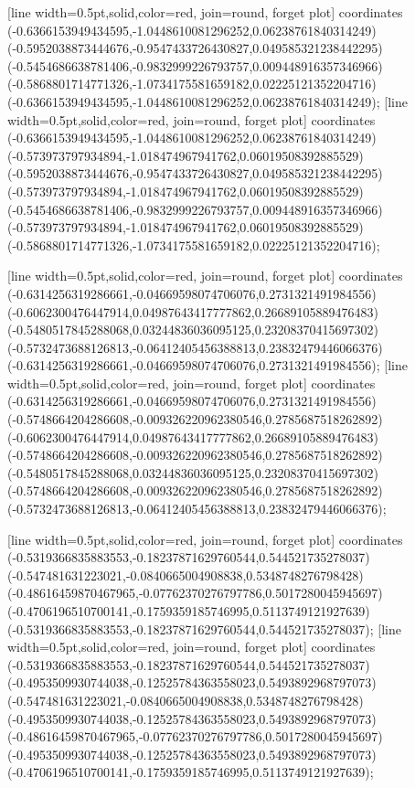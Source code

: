 [line width=0.5pt,solid,color=red, join=round, forget plot] coordinates {(-0.6366153949434595,-1.0448610081296252,0.06238761840314249) (-0.5952038873444676,-0.9547433726430827,0.049585321238442295) (-0.5454686638781406,-0.9832999226793757,0.009448916357346966) (-0.5868801714771326,-1.0734175581659182,0.02225121352204716) (-0.6366153949434595,-1.0448610081296252,0.06238761840314249)};
[line width=0.5pt,solid,color=red, join=round, forget plot] coordinates {(-0.6366153949434595,-1.0448610081296252,0.06238761840314249) (-0.573973797934894,-1.018474967941762,0.06019508392885529) (-0.5952038873444676,-0.9547433726430827,0.049585321238442295) (-0.573973797934894,-1.018474967941762,0.06019508392885529) (-0.5454686638781406,-0.9832999226793757,0.009448916357346966) (-0.573973797934894,-1.018474967941762,0.06019508392885529) (-0.5868801714771326,-1.0734175581659182,0.02225121352204716)};

[line width=0.5pt,solid,color=red, join=round, forget plot] coordinates {(-0.6314256319286661,-0.04669598074706076,0.2731321491984556) (-0.6062300476447914,0.04987643417777862,0.26689105889476483) (-0.5480517845288068,0.03244836036095125,0.23208370415697302) (-0.5732473688126813,-0.06412405456388813,0.23832479446066376) (-0.6314256319286661,-0.04669598074706076,0.2731321491984556)};
[line width=0.5pt,solid,color=red, join=round, forget plot] coordinates {(-0.6314256319286661,-0.04669598074706076,0.2731321491984556) (-0.5748664204286608,-0.009326220962380546,0.2785687518262892) (-0.6062300476447914,0.04987643417777862,0.26689105889476483) (-0.5748664204286608,-0.009326220962380546,0.2785687518262892) (-0.5480517845288068,0.03244836036095125,0.23208370415697302) (-0.5748664204286608,-0.009326220962380546,0.2785687518262892) (-0.5732473688126813,-0.06412405456388813,0.23832479446066376)};

[line width=0.5pt,solid,color=red, join=round, forget plot] coordinates {(-0.5319366835883553,-0.18237871629760544,0.544521735278037) (-0.547481631223021,-0.0840665004908838,0.5348748276798428) (-0.48616459870467965,-0.07762370276797786,0.5017280045945697) (-0.4706196510700141,-0.1759359185746995,0.5113749121927639) (-0.5319366835883553,-0.18237871629760544,0.544521735278037)};
[line width=0.5pt,solid,color=red, join=round, forget plot] coordinates {(-0.5319366835883553,-0.18237871629760544,0.544521735278037) (-0.4953509930744038,-0.12525784363558023,0.5493892968797073) (-0.547481631223021,-0.0840665004908838,0.5348748276798428) (-0.4953509930744038,-0.12525784363558023,0.5493892968797073) (-0.48616459870467965,-0.07762370276797786,0.5017280045945697) (-0.4953509930744038,-0.12525784363558023,0.5493892968797073) (-0.4706196510700141,-0.1759359185746995,0.5113749121927639)};

